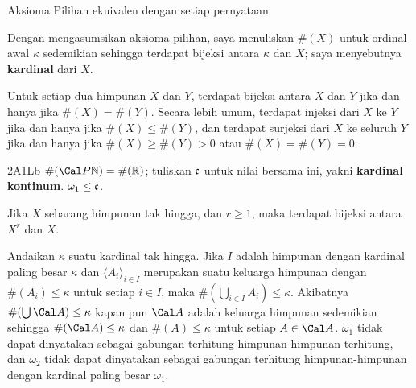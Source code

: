  Aksioma Pilihan
ekuivalen dengan setiap pernyataan





 Dengan mengasumsikan aksioma pilihan, saya menuliskan
$\#(X)$ untuk ordinal awal $\kappa$ sedemikian sehingga terdapat bijeksi
antara $\kappa$ dan $X$; saya menyebutnya {\bf kardinal} dari $X$.

 Untuk setiap dua
himpunan $X$ dan $Y$, terdapat bijeksi antara $X$ dan $Y$ jika dan hanya jika
$\#(X)=\#(Y)$. Secara lebih umum, terdapat injeksi dari $X$ ke $Y$ jika dan
hanya jika $\#(X)\le\#(Y)$, dan terdapat surjeksi dari $X$ ke seluruh $Y$
jika dan hanya jika $\#(X)\ge\#(Y)>0$ atau $\#(X)=\#(Y)=0$.

\spheader 2A1Lb $\#(\Cal P\Bbb N)=\#(\Bbb R)$;
tuliskan $\frak c$ untuk nilai bersama ini, yakni {\bf kardinal kontinum}.
 $\omega_1\le\frak c$.

 Jika $X$ sebarang himpunan tak hingga, dan $r\ge 1$,
maka terdapat bijeksi antara $X^r$ dan $X$.  

 Andaikan $\kappa$ suatu kardinal tak hingga. Jika
$I$ adalah himpunan dengan kardinal paling besar $\kappa$ dan
$\langle A_i\rangle_{i\in I}$ merupakan suatu keluarga himpunan dengan
$\#(A_i)\le\kappa$ untuk setiap $i\in I$, maka
$\#(\bigcup_{i\in I}A_i)\le\kappa$. Akibatnya
$\#(\bigcup\Cal A)\le\kappa$ kapan pun $\Cal A$ adalah keluarga himpunan
sedemikian sehingga $\#(\Cal A)\le\kappa$ dan $\#(A)\le\kappa$ untuk setiap
$A\in\Cal A$.  $\omega_1$ tidak dapat dinyatakan sebagai
gabungan terhitung himpunan-himpunan terhitung, dan $\omega_2$ tidak dapat
dinyatakan sebagai gabungan terhitung himpunan-himpunan dengan kardinal
paling besar $\omega_1$.

